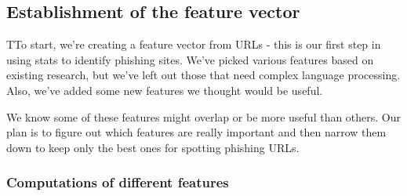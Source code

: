 \documentclass{article}
\begin{document}
    \subsection{Establishment of the feature vector}\label{subsec:establishement-of-the-feature-vector}

    TTo start, we're creating a feature vector from URLs - this is our first step in using stats to identify phishing sites.
    We've picked various features based on existing research, but we've left out those that need complex language processing.
    Also, we've added some new features we thought would be useful.

    We know some of these features might overlap or be more useful than others.
    Our plan is to figure out which features are really important and then narrow them down to keep only the best ones for spotting phishing URLs.

    \subsubsection{Computations of different features}
\end{document}
